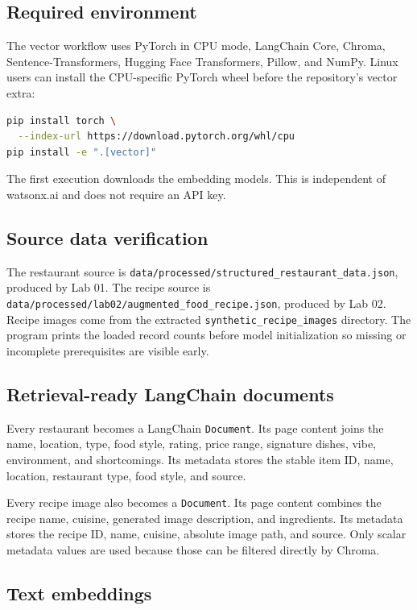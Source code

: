 \documentclass[11pt]{article}
\begin{document}
\subsection{Required environment}

The vector workflow uses PyTorch in CPU mode, LangChain Core, Chroma,
Sentence-Transformers, Hugging Face Transformers, Pillow, and NumPy. Linux users
can install the CPU-specific PyTorch wheel before the repository's vector
extra:

\begin{lstlisting}[language=bash]
pip install torch \
  --index-url https://download.pytorch.org/whl/cpu
pip install -e ".[vector]"
\end{lstlisting}

The first execution downloads the embedding models. This is independent of
watsonx.ai and does not require an API key.

\subsection{Source data verification}

The restaurant source is
\texttt{data/processed/structured\_restaurant\_data.json}, produced by Lab 01.
The recipe source is
\texttt{data/processed/lab02/augmented\_food\_recipe.json}, produced by Lab 02.
Recipe images come from the extracted
\texttt{synthetic\_recipe\_images} directory. The program prints the loaded
record counts before model initialization so missing or incomplete prerequisites
are visible early.

\subsection{Retrieval-ready LangChain documents}

Every restaurant becomes a LangChain \texttt{Document}. Its page content joins
the name, location, type, food style, rating, price range, signature dishes,
vibe, environment, and shortcomings. Its metadata stores the stable item ID,
name, location, restaurant type, food style, and source.

Every recipe image also becomes a \texttt{Document}. Its page content combines
the recipe name, cuisine, generated image description, and ingredients. Its
metadata stores the recipe ID, name, cuisine, absolute image path, and source.
Only scalar metadata values are used because those can be filtered directly by
Chroma.

\subsection{Text embeddings}
\end{document}
